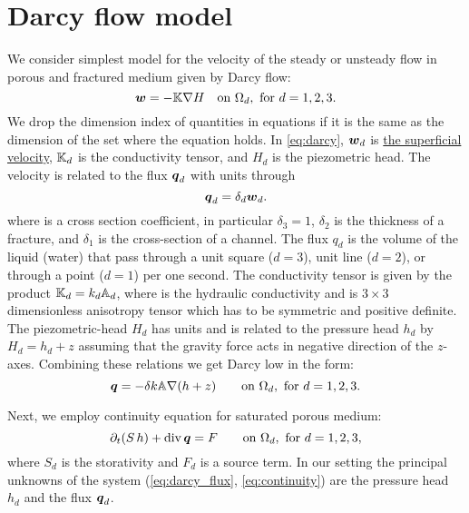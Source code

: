 
\section{Darcy flow model}
We consider simplest model for the velocity of the steady or unsteady flow in porous and fractured medium given by 
Darcy flow:
\begin{equation}
    \label{eq:darcy}
    \vc w = -\tn K \grad H \quad\text{on }\Omega_d,\ \text{for $d=1,2,3$}.
\end{equation}
We drop the dimension index of quantities in equations if it is the same as the dimension of the set where the equation holds.
In \eqref{eq:darcy}, $\mathbf{\boldsymbol{w}}_d$  is \href{http://en.wikipedia.org/wiki/Superficial_velocity}{the superficial velocity},
${\mathbb{K}}_d$ is the conductivity tensor, and $H_d$  is the piezometric head. The velocity is related to the flux $\mathbf{\boldsymbol{q}}_d$ 
with units  through
\[
    \mathbf{\boldsymbol{q}}_d = \delta_d \mathbf{\boldsymbol{w}}_d.
\]
where 
 is a cross section coefficient, in particular $\delta_3=1$, $\delta_2$  is the thickness of a fracture, and $\delta_1$  is the cross-section of a channel.
The flux $q_d$ is the volume of the liquid (water) that pass through a unit square ($d=3$),
unit line ($d=2$), or through a point ($d=1$) per one second. 
The conductivity tensor is given by the product 
${\mathbb{K}}_d = k_d {\mathbb{A}}_d$, where 
 is the hydraulic conductivity  and 
 is 
$3\times 3$ dimensionless anisotropy tensor which has to be symmetric and positive definite. The piezometric-head $H_d$ has units  and is related to the pressure head
$h_d$ by $H_d = h_d + z$ assuming that the gravity force acts in negative direction of the $z$-axes. 
Combining these relations we get Darcy low in the form:
\begin{equation}
    \label{eq:darcy_flux}
    \vc q = -\delta k\tn A \grad (h+z)  \qquad\text{on }\Omega_d,\ \text{for $d=1,2,3$}.
\end{equation}

Next, we employ continuity equation for saturated porous medium:
\begin{equation}
    \label{eq:continuity}
    \prtl_t (S\, h) + \div \vc q = F \qquad \text{on }\Omega_d,\ \text{for $d=1,2,3$},
\end{equation}
where $S_d$ is the storativity and $F_d$ is a source term. In our setting the principal unknowns of the system 
(\ref{eq:darcy_flux}, \ref{eq:continuity}) are the pressure head $h_d$ and the flux $\mathbf{\boldsymbol{q}}_d$.



